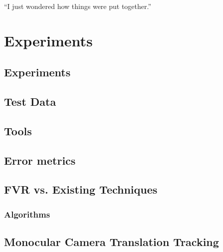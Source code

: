 \begin{savequote}[8cm]
  ``I just wondered how things were put together.''
\end{savequote}
\makeatletter
\chapter{Experiments}
\label{ch:Experiments}

\section{Experiments}



\section{Test Data}
\label{TestDataSection}


\section{Tools}
\label{ToolsSection}


\section{Error metrics}
\label{metricsSection}







\section{FVR vs. Existing Techniques}
\label{Sec:FVRSOTA}
\subsection{Algorithms} \label{AlgorithmsSection} 



\section{Monocular Camera Translation Tracking}
\label{Sec:MonocularExperimentsSection}


